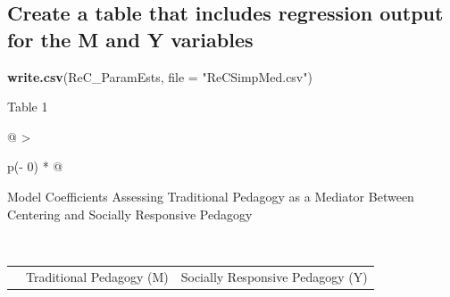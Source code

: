 \documentclass[
  11pt,
]{book}
\newenvironment{Shaded}{\begin{snugshade}}{\end{snugshade}}
\newcommand{\AttributeTok}[1]{\textcolor[rgb]{0.27,0.27,0.27}{#1}}
\newcommand{\FunctionTok}[1]{\textcolor[rgb]{0.27,0.27,0.27}{\textbf{#1}}}
\newcommand{\NormalTok}[1]{#1}
\newcommand{\StringTok}[1]{\textcolor[rgb]{0.5,0.5,0.5}{#1}}
\begin{document}
\hypertarget{create-a-table-that-includes-regression-output-for-the-m-and-y-variables}{%
\subsection*{Create a table that includes regression output for the M and Y variables}\label{create-a-table-that-includes-regression-output-for-the-m-and-y-variables}}


\begin{Shaded}
\begin{Highlighting}[]
\FunctionTok{write.csv}\NormalTok{(ReC\_ParamEsts, }\AttributeTok{file =} \StringTok{"ReCSimpMed.csv"}\NormalTok{)}
\end{Highlighting}
\end{Shaded}

Table 1

\begin{longtable}[]{@{}
  >{\raggedright\arraybackslash}p{(\columnwidth - 0\tabcolsep) * }@{}}
\toprule\noalign{}
\begin{minipage}[b]{\linewidth}\raggedright
Model Coefficients Assessing Traditional Pedagogy as a Mediator Between Centering and Socially Responsive Pedagogy
\end{minipage} \\
\midrule\noalign{}
\endhead
\bottomrule\noalign{}
\endlastfoot
\end{longtable}

\begin{longtable}[]{@{}
  >{\raggedright\arraybackslash}p{}
  >{\centering\arraybackslash}p{}
  >{\centering\arraybackslash}p{}@{}}
\toprule\noalign{}
\endhead
\bottomrule\noalign{}
\endlastfoot
& Traditional Pedagogy (M) & Socially Responsive Pedagogy (Y) \\
\end{longtable}
\end{document}
